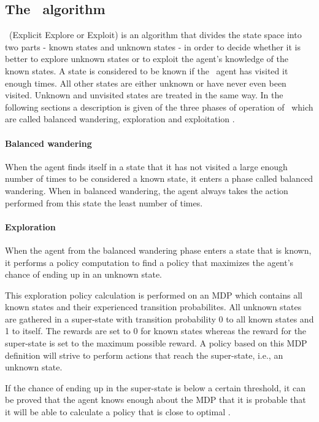 \subsection{The \etre\ algorithm}
\label{sec:e3}

\etre\ (Explicit Explore or Exploit) is an algorithm that divides the state space into two parts - known states and unknown states - in order to decide whether it is better to explore unknown states or to exploit the agent's knowledge of the known states. A state is considered to be known if the \etre\ agent has visited it enough times. All other states are either unknown or have never even been visited. Unknown and unvisited states are treated in the same way. In the following sections a description is given of the three phases of operation of \etre\, which are called balanced wandering, exploration and exploitation \parencite{kearns2002near}.

\paragraph{Balanced wandering}

When the agent finds itself in a state that it has not visited a large enough number of times to be considered a known state, it enters a phase called balanced wandering. When in balanced wandering, the agent always takes the action performed from this state the least number of times. 


\paragraph{Exploration}
When the agent from the balanced wandering phase enters a state that is known, it performs a policy computation to find a policy that maximizes the agent's chance of ending up in an unknown state. 

This exploration policy calculation is performed on an MDP which contains all known states and their experienced transition probabilites. 
All unknown states are gathered in a super-state with transition probability 0 to all known states and 1 to itself. The rewards are set to 0 for known states whereas the reward for the super-state is set to the maximum possible reward. A policy based on this MDP definition will strive to perform actions that reach the super-state, i.e., an unknown state.

If the chance of ending up in the super-state is below a certain threshold, it can be proved that the agent knows enough about the MDP that it is probable that it will be able to calculate a policy that is close to optimal \parencite{kearns2002near}.

